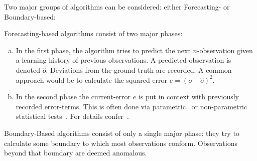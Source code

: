 Two major groups of algorithms can be considered: either Forecasting- or
Boundary-based:
\begin{definition}
    Forecasting-based algorithms consist of two major phases:
    \begin{enumerate}[a.)]
        \item In the first phase, the algorithm tries to predict the next \(n\)-observation
        given a learning history of previous observations. A predicted observation
        is denoted \(\hat{o}\). Deviations from the ground truth are recorded.
        A common approach would be to calculate the squared error \(e = {\left(o - \hat{o}\right)}^2\).
        \item In the second phase the current-error \(e\) is put in context with
        previously recorded error-terms. This is often done via 
        parametric~\cite{Malhotra.2015,Ahmad.2017,Guo.2016,Malhotra.2016,Shipmon.2017,Chauhan.2015} or 
        non-parametric statistical tests~\cite{Zhu.2017,Hundman.2018,Maimo.2018,Su.2019}.
        For details confer~\cite{Zietlow.2020}.
    \end{enumerate}
\end{definition}

\begin{definition}
    Boundary-Based algorithms consist of only a single major phase:
    they try to calculate some boundary to which most observations conform.
    Observations beyond that boundary are deemed anomalous.
\end{definition}
